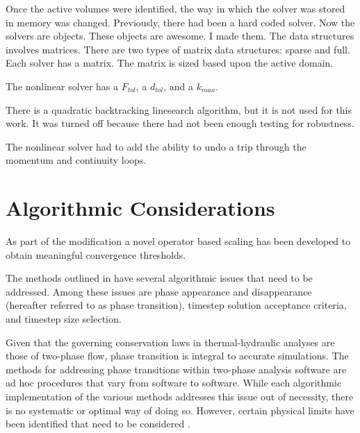 Once the active volumes were identified, the way in which the solver was stored in memory was changed.
Previously, there had been a hard coded solver.
Now the solvers are objects.
These objects are awesome.
I made them.
The data structures involves matrices.
There are two types of matrix data structures: sparse and full.
Each solver has a matrix.
The matrix is sized based upon the active domain.


The nonlinear solver has a $F_{tol}$, a $d_{tol}$, and a $k_{max}$.

There is a quadratic backtracking linesearch algorithm, but it is not used for this work.
It was turned off because there had not been enough testing for robustness.


The nonlinear solver had to add the ability to undo a trip through the momentum and continuity loops.

\section{Algorithmic Considerations}
\label{sect:algoConcerns}

As part of the \cobra{} modification a novel operator based scaling has been developed to obtain meaningful convergence thresholds.

The methods outlined in  have several algorithmic issues that need to be addressed.
Among these issues are phase appearance and disappearance (hereafter referred to as phase transition), timestep solution acceptance criteria, and timestep size selection.

Given that the governing conservation laws in thermal-hydraulic analyses are those of two-phase flow, phase transition is integral to accurate simulations.
The methods for addressing phase transitions within two-phase analysis software are ad hoc procedures that vary from software to software.
While each algorithmic implementation of the various methods addresses this issue out of necessity, there is no systematic or optimal way of doing so.
However, certain physical limits have been identified that need to be considered \cite{Bestion2000}.

